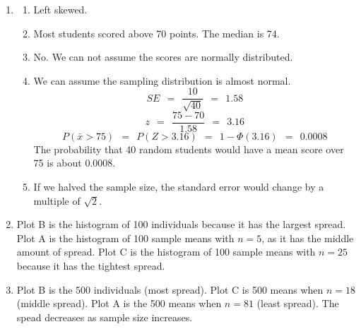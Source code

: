 \documentclass[12pt,letterpaper]{article}
\begin{document}
\begin{enumerate}
\item \begin{enumerate}
\item Left skewed.
\item Most students scored above 70 points. The median is 74.
\item No. We can not assume the scores are normally distributed.
\item We can assume the sampling distribution is almost normal.
$$SE ~~=~~ \frac{10}{\sqrt{40}} ~~=~~ 1.58 $$
$$z ~~=~~ \frac{75-70}{1.58} ~~=~~ 3.16 $$
$$P(\bar{x}>75) ~~=~~ P(Z > 3.16) ~~=~~ 1-\Phi(3.16) ~~=~~ 0.0008 $$
The probability that 40 random students would have a mean score over 75 is about 0.0008.
\item If we halved the sample size, the standard error would change by a multiple of $\sqrt{2}$.
\end{enumerate}

\item Plot B is the histogram of 100 individuals because it has the largest spread. Plot A is the histogram of 100 sample means with $n=5$, as it has the middle amount of spread. Plot C is the histogram of 100 sample means with $n=25$ because it has the tightest spread.

\item Plot B is the 500 individuals (most spread). Plot C is 500 means when $n=18$ (middle spread). Plot A is the 500 means when $n=81$ (least spread). The spead decreases as sample size increases.

\newpage


\end{enumerate}
\end{document}
